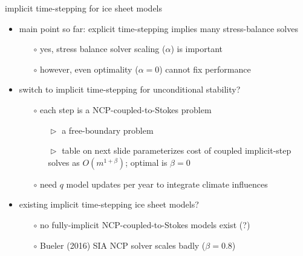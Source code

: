 \documentclass[svgnames,
               hyperref={colorlinks,citecolor=DeepPink4,linkcolor=FireBrick,urlcolor=Maroon},
               usepdftitle=false]  %
               {beamer}
\begin{document}
\begin{frame}{implicit time-stepping for ice sheet models}

\begin{itemize}
\item main point so far: \alert{explicit} time-stepping \alert{implies many stress-balance solves}
    \begin{itemize}
    \item[$\circ$] yes, stress balance solver scaling ($\alpha$) is important
    \item[$\circ$] however, even optimality ($\alpha=0$) cannot fix performance
    \end{itemize}
\item switch to \alert{implicit time-stepping} for unconditional stability?
    \begin{itemize}
    \item[$\circ$] each step is a NCP-coupled-to-Stokes problem
        \begin{itemize}
        \item[$\vartriangleright$] a \alert{free-boundary problem}
        \item[$\vartriangleright$] table on next slide parameterizes cost of coupled implicit-step solves as $O(m^{1+\beta})$; optimal is $\beta=0$
        \end{itemize}
    \item[$\circ$] need $q$ model updates per year to integrate climate influences
    \end{itemize}

\bigskip
\item<2> \alert{existing} implicit time-stepping ice sheet models?
    \begin{itemize}
    \item[$\circ$] no fully-implicit NCP-coupled-to-Stokes models exist (?)
    \item[$\circ$] Bueler (2016) SIA NCP solver scales badly ($\beta=0.8$)
    \end{itemize}
\end{itemize}
\end{frame}
\end{document}
